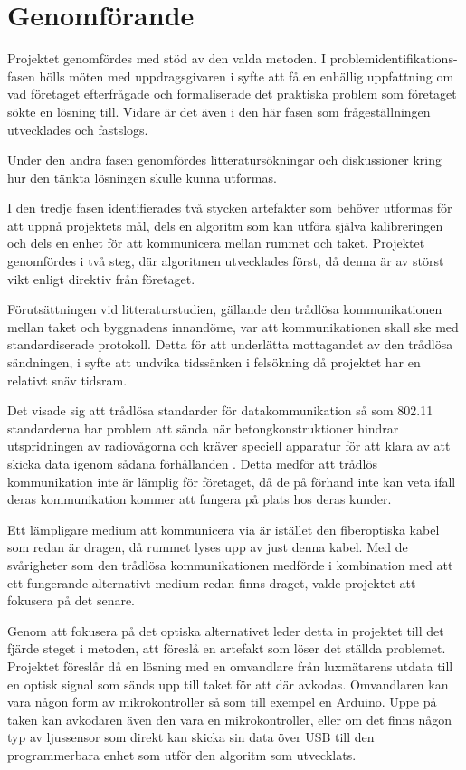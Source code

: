 \section{Genomförande} %
\label{sec:genomf_rande}

    Projektet genomfördes med stöd av den valda metoden. I problemidentifikations-fasen hölls möten med uppdragsgivaren i syfte att få en enhällig uppfattning om vad företaget efterfrågade och formaliserade det praktiska problem som företaget sökte en lösning till. Vidare är det även i den här fasen som frågeställningen utvecklades och fastslogs. \bigskip

    Under den andra fasen genomfördes litteratursökningar och diskussioner kring hur den tänkta lösningen skulle kunna utformas.  \bigskip

    I den tredje fasen identifierades två stycken artefakter som behöver utformas för att uppnå projektets mål, dels en algoritm som kan utföra själva kalibreringen och dels en enhet för att kommunicera mellan rummet och taket. Projektet genomfördes i två steg, där algoritmen utvecklades först, då denna är av störst vikt enligt direktiv från företaget.\bigskip

    Förutsättningen vid litteraturstudien, gällande den trådlösa kommunikationen mellan taket och byggnadens innandöme, var att kommunikationen skall ske med standardiserade protokoll. Detta för att underlätta mottagandet av den trådlösa sändningen, i syfte att undvika tidssänken i felsökning då projektet har en relativt snäv tidsram.\bigskip

    Det visade sig att trådlösa standarder för datakommunikation så som 802.11 standarderna har problem att sända när betongkonstruktioner hindrar utspridningen av radiovågorna och kräver speciell apparatur för att klara av att skicka data igenom sådana förhållanden \cite{11n}. Detta medför att trådlös kommunikation inte är lämplig för företaget, då de på förhand inte kan veta ifall deras kommunikation kommer att fungera på plats hos deras kunder. \bigskip

    Ett lämpligare medium att kommunicera via är istället den fiberoptiska kabel som redan är dragen, då rummet lyses upp av just denna kabel. Med de svårigheter som den trådlösa kommunikationen medförde i kombination med att ett fungerande alternativt medium redan finns draget, valde projektet att fokusera på det senare. \bigskip

    Genom att fokusera på det optiska alternativet leder detta in projektet till det fjärde steget i metoden, att föreslå en artefakt som löser det ställda problemet. Projektet föreslår då en lösning med en omvandlare från luxmätarens utdata till en optisk signal som sänds upp till taket för att där avkodas. Omvandlaren kan vara någon form av mikrokontroller så som till exempel en Arduino. Uppe på taken kan avkodaren även den vara en mikrokontroller, eller om det finns någon typ av ljussensor som direkt kan skicka sin data över USB till den programmerbara enhet som utför den algoritm som utvecklats.

